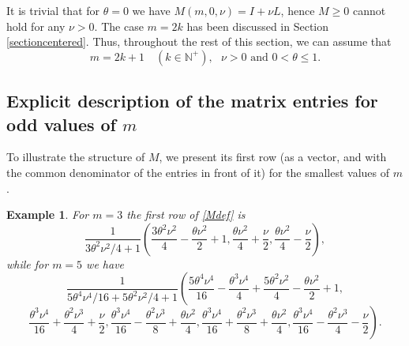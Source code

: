 \documentclass[a4paper]{article}
\newtheorem{remark}{Remark}
\newtheorem{example}{Example}
\newcommand{\te}{\theta}
\newcommand{\nplus}{\mathbb{N}^+}
\begin{document}
It is trivial that for $\te=0$ we have $M(m,0,\nu)=I+\nu L$, hence $M\ge 0$ cannot hold for any $\nu>0$. The case $m=2k$ has been discussed in Section \ref{sectioncentered}. Thus, throughout the rest of this section, we can assume that 
\begin{equation}\label{genassump}
\boxed{ 
m=2k+1\quad (k\in\nplus), \ \ \ \nu>0 \text{\ \  and\ \  } 0<\te\le 1.}
\end{equation}

\subsection{Explicit description of the matrix entries for odd values of $m$}\label{explsect}





To illustrate the structure of $M$, we present its first row (as a vector, and with the common denominator of the entries in front of it) for the smallest values of $m$. 
\begin{example}\label{example1} 
For $m=3$ the first row of \eqref{Mdef} is 
\[
\frac{1}{{3 \theta ^2 \nu ^2}/{4}+1}\left(\frac{3 \theta ^2 \nu ^2}{4}-\frac{\theta  \nu ^2}{2}+1,\frac{\theta  \nu ^2}{4}+\frac{\nu }{2},\frac{\theta  \nu ^2}{4}-\frac{\nu }{2}\right),
\]
while for $m=5$ we have 
\[
\frac{1}{{5 \theta ^4 \nu ^4}/{16}+{5 \theta ^2 \nu ^2}/{4}+1}\left(\frac{5 \theta ^4 \nu ^4}{16}-\frac{\theta ^3 \nu ^4}{4}+\frac{5 \theta ^2 \nu ^2}{4}-\frac{\theta  \nu ^2}{2}+1,\right.
\]
\[
\left.\frac{\theta ^3 \nu
   ^4}{16}+\frac{\theta ^2 \nu ^3}{4}+\frac{\nu }{2},\frac{\theta ^3 \nu ^4}{16}-\frac{\theta ^2 \nu ^3}{8}+\frac{\theta  \nu ^2}{4},\frac{\theta ^3
   \nu ^4}{16}+\frac{\theta ^2 \nu ^3}{8}+\frac{\theta  \nu ^2}{4},\frac{\theta ^3 \nu ^4}{16}-\frac{\theta ^2 \nu ^3}{4}-\frac{\nu }{2}\right).
\]

\end{example}
\end{document}
